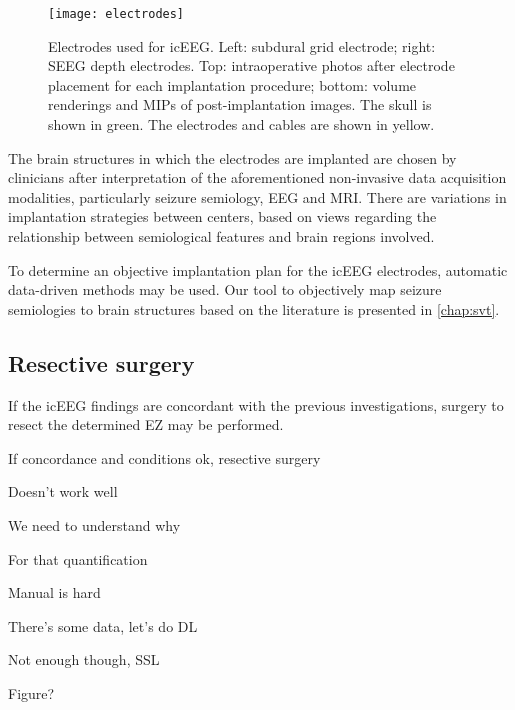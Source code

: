 \begin{figure}
  \centering
  \texttt{[image: electrodes]}
  \caption[Electrodes used for intracranial EEG]{
    Electrodes used for \ac{icEEG}.
    Left: subdural grid electrode;
    right: \ac{SEEG} depth electrodes.
    Top: intraoperative photos after electrode placement for each implantation procedure;
    bottom: volume renderings and \acp{MIP} of post-implantation images.
    The skull is shown in green. The electrodes and cables are shown in yellow.
  }\label{fig:electrodes}
\end{figure}

The brain structures in which the electrodes are implanted are chosen by clinicians after interpretation of the aforementioned non-invasive data acquisition modalities, particularly seizure semiology, \ac{EEG} and \ac{MRI}.
There are variations in implantation strategies between centers, based on views regarding the relationship between semiological features and brain regions involved.

To determine an objective implantation plan for the \ac{icEEG} electrodes, automatic data-driven methods may be used.
Our tool to objectively map seizure semiologies to brain structures based on the literature is presented in \cref{chap:svt}.


\subsection{Resective surgery}

If the \ac{icEEG} findings are concordant with the previous investigations, surgery to resect the determined \ac{EZ} may be performed.

If concordance and conditions ok, resective surgery

Doesn't work well

We need to understand why

For that quantification

Manual is hard

There's some data, let's do DL

Not enough though, SSL

Figure?
